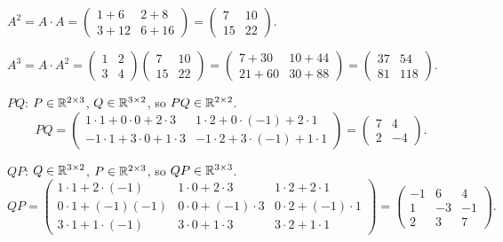 \begin{solutions}
    \item $A^{2} = A \cdot A = \begin{pmatrix} 1 + 6 & 2 + 8 \\ 3 + 12 & 6 + 16 \end{pmatrix} = \begin{pmatrix} 7 & 10 \\ 15 & 22 \end{pmatrix}$.

    \item $A^{3} = A \cdot A^{2} = \begin{pmatrix} 1 & 2 \\ 3 & 4 \end{pmatrix}\begin{pmatrix} 7 & 10 \\ 15 & 22 \end{pmatrix} = \begin{pmatrix} 7 + 30 & 10 + 44 \\ 21 + 60 & 30 + 88 \end{pmatrix} = \begin{pmatrix} 37 & 54 \\ 81 & 118 \end{pmatrix}$.

    \item $P Q$: $P \in \mathbb{R}^{2 \times 3}$, $Q \in \mathbb{R}^{3 \times 2}$, so $P Q \in \mathbb{R}^{2 \times 2}$.
    \[
    P Q = \begin{pmatrix} 1 \cdot 1 + 0 \cdot 0 + 2 \cdot 3 & 1 \cdot 2 + 0 \cdot (-1) + 2 \cdot 1 \\ -1 \cdot 1 + 3 \cdot 0 + 1 \cdot 3 & -1 \cdot 2 + 3 \cdot (-1) + 1 \cdot 1 \end{pmatrix} = \begin{pmatrix} 7 & 4 \\ 2 & -4 \end{pmatrix}.
    \]

    \item $Q P$: $Q \in \mathbb{R}^{3 \times 2}$, $P \in \mathbb{R}^{2 \times 3}$, so $Q P \in \mathbb{R}^{3 \times 3}$.
    \[
    Q P = \begin{pmatrix} 1 \cdot 1 + 2 \cdot (-1) & 1 \cdot 0 + 2 \cdot 3 & 1 \cdot 2 + 2 \cdot 1 \\ 0 \cdot 1 + (-1)(-1) & 0 \cdot 0 + (-1) \cdot 3 & 0 \cdot 2 + (-1) \cdot 1 \\ 3 \cdot 1 + 1 \cdot (-1) & 3 \cdot 0 + 1 \cdot 3 & 3 \cdot 2 + 1 \cdot 1 \end{pmatrix} = \begin{pmatrix} -1 & 6 & 4 \\ 1 & -3 & -1 \\ 2 & 3 & 7 \end{pmatrix}.
    \]


\end{solutions}
